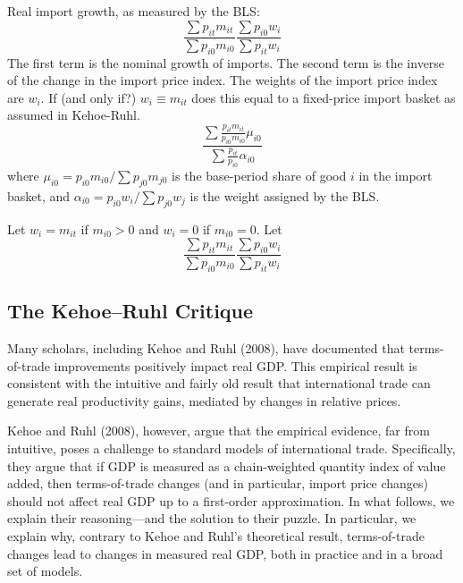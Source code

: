 \documentclass[12pt]{article}
\begin{document}
\subsection{}
Real import growth, as measured by the BLS:
\[
\frac 
	{\sum p_{it}m_{it}}
	{\sum p_{i0}m_{i0}}
\frac 
	{\sum p_{i0}w_{i}}
	{\sum p_{it}w_{i}}
\]
The first term is the nominal growth of imports. The second term is the inverse of the change in the import price index. The weights of the import price index are $w_i$. If (and only if?) $w_i\equiv m_{it}$ does this equal to a fixed-price import basket as assumed in Kehoe-Ruhl.
\[
\frac
	{\sum
	\frac 
		{p_{it}m_{it}}
		{p_{i0}m_{i0}}
		\mu_{i0}}
	{\sum
	\frac 
		{p_{it}}
		{p_{i0}}
		\alpha_{i0}}
\]
where $\mu_{i0}=p_{i0}m_{i0}/\sum p_{j0}m_{j0}$ is the base-period share of good $i$ in the import basket, and $\alpha_{i0}=p_{i0}w_{i}/\sum p_{j0}w_{j}$ is the weight assigned by the BLS.

Let $w_i = m_{it}$ if $m_{i0}>0$ and $w_i = 0$ if $m_{i0}=0$. Let 
\[
\frac 
	{\sum p_{it}m_{it}}
	{\sum p_{i0}m_{i0}}
\frac 
	{\sum p_{i0}w_{i}}
	{\sum p_{it}w_{i}}
\]

\subsection{The Kehoe--Ruhl Critique}

Many scholars, including Kehoe and Ruhl (2008), have documented that
terms-of-trade improvements positively impact real GDP. This empirical
result is consistent with the intuitive and fairly old result that
international trade can generate real productivity gains, mediated by
changes in relative prices.

Kehoe and Ruhl (2008), however, argue that the empirical evidence, far from
intuitive, poses a challenge to standard models of international trade.
Specifically, they argue that if GDP is measured as a chain-weighted
quantity index of value added, then terms-of-trade changes (and in
particular, import price changes) should not affect real GDP up to a
first-order approximation. In what follows, we explain their reasoning---and
the solution to their puzzle. In particular, we explain why, contrary to
Kehoe and Ruhl's theoretical result, terms-of-trade changes lead to changes
in measured real GDP, both in practice and in a broad set of models.
\end{document}
